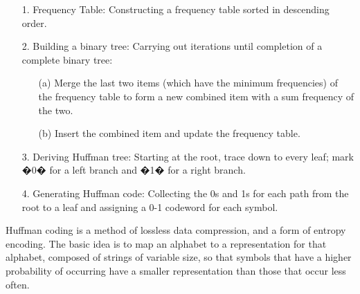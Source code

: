 {
\begin{itemize}
\item[1.] Frequency Table: Constructing a frequency table sorted in descending order.

\item[2.] Building a binary tree:
    Carrying out iterations until completion of a complete binary tree:
    \begin{itemize}
    \item[(a)] Merge the last two items (which have the minimum frequencies) of    the frequency table to form a new combined item with a sum
    frequency of the two.
    \item[(b)] Insert the combined item and update the frequency table.
    \end{itemize}

\item[3.] Deriving Huffman tree:
Starting at the root, trace down to every leaf; mark �0� for a left branch and �1� for a right branch.

\item[4.] Generating Huffman code:
Collecting the 0s and 1s for each path from the root to a leaf and assigning a 0-1 codeword for each symbol.

\end{itemize}
}

{

Huffman coding is a method of lossless data compression, and a form of entropy encoding. The basic idea is to map an alphabet to a representation for that alphabet, composed of strings of variable size, so that symbols that have a higher probability of occurring have a smaller representation than those that occur less often.

}

